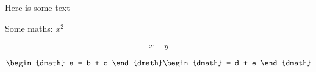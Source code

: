 \documentclass[12pt]{article}
\begin{document}
\renewcommand{\baselinestretch}{1.250000}
\selectfont
\setlength{\parskip}{1.0\baselineskip}


\begin{spverbatim}
Here is some text
\end{spverbatim}

Some maths: \(x^2\)

\begin{dmath}[compact,spread={1.250000\baselineskip}] x + y \end{dmath}

\begin{dgroup*}[compact,spread={1.250000\baselineskip}]\begin{dmath} a  = b + c \end{dmath}\begin{dmath}
  = d + e \end{dmath}\end{dgroup*}
\end{document}
